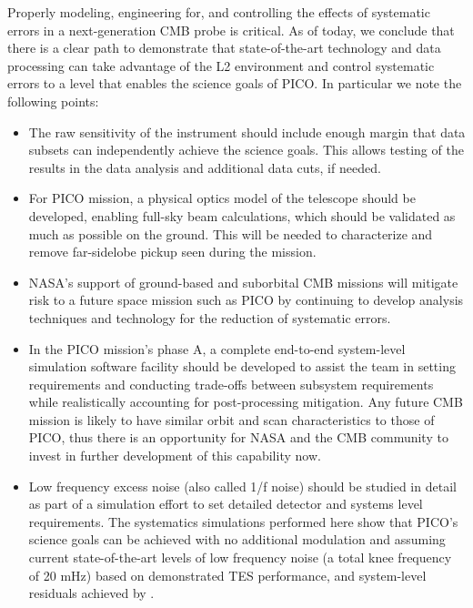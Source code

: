 \documentclass[PICOReport.tex]{subfiles}
\begin{document}
Properly modeling, engineering for, and controlling the effects of systematic errors in a
next-generation CMB probe is critical.  As of today, we conclude that there is a clear path to demonstrate that state-of-the-art technology and data processing can take advantage of the L2 environment and control systematic errors to a level that enables the science goals of PICO. In particular we note the following points:
\begin{itemize}
\item The raw sensitivity of the instrument should include enough margin
that data subsets can independently achieve the science goals.
This allows testing of the results in the data analysis and additional
data cuts, if needed.
\item For PICO mission, a physical optics model of the telescope should be developed, enabling full-sky beam calculations, which should be validated as much as possible on the ground.  This will be needed to characterize and remove far-sidelobe pickup seen during the mission. 
\item NASA's support of ground-based and suborbital CMB missions will mitigate risk to a future space mission such as PICO by continuing to develop analysis techniques and technology for the reduction of systematic errors.

\item In the PICO mission's phase A, a complete end-to-end system-level
simulation software facility should be developed to assist the team in setting 
requirements and conducting trade-offs between subsystem requirements while
realistically accounting for post-processing mitigation.  Any future
CMB mission is likely to have similar orbit  
and scan characteristics to those of PICO, thus there is an opportunity for NASA and
the CMB community to invest in further development of this capability now.
\item Low frequency excess noise (also called 1/f noise) should be studied in detail as part of a simulation effort to set detailed detector and systems level requirements.  The systematics simulations performed here show that PICO's science goals can be achieved with no additional modulation and assuming current state-of-the-art levels of low frequency noise (a total knee frequency of 20 mHz) based on demonstrated TES performance, and system-level residuals achieved by \planck.
\end{itemize}
\end{document}
